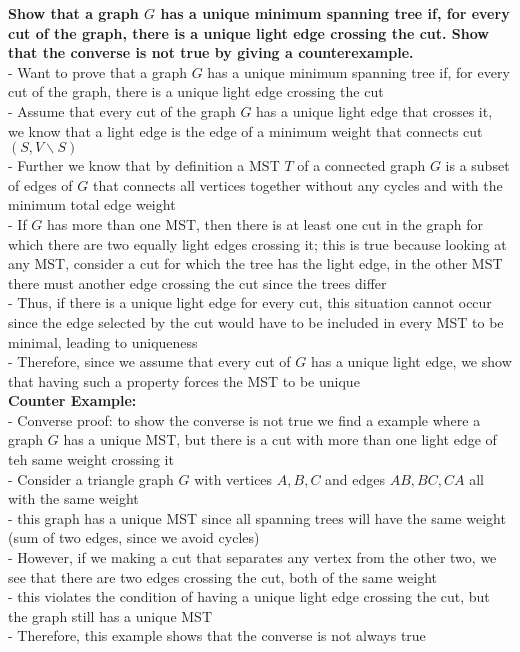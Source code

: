 \documentclass[letterpaper,12pt]{article}
\begin{document}
\begin{enumerate}
\textbf{Show that a graph $G$ has a unique minimum spanning tree if, for every cut of the
graph, there is a unique light edge crossing the cut. Show that the converse is not
true by giving a counterexample.} \\
- Want to prove that a graph $G$ has a unique minimum spanning tree if, for every cut of the graph, there is a unique light edge crossing the cut \\
- Assume that every cut of the graph $G$ has a unique light edge that crosses it, we know that a light edge is the edge of a minimum weight that connects cut $(S, V \backslash S)$ \\
- Further we know that by definition a MST $T$ of a connected graph $G$ is a subset of edges of $G$ that connects all vertices together without any cycles and with the minimum total edge weight \\
- If $G$ has more than one MST, then there is at least one cut in the graph for which there are two equally light edges crossing it; this is true because looking at any MST, consider a cut for which the tree has the light edge, in the other MST there must another edge crossing the cut since the trees differ \\
- Thus, if there is a unique light edge for every cut, this situation cannot occur since the edge selected by the cut would have to be included in every MST to be minimal, leading to uniqueness \\
- Therefore, since we assume that every cut of $G$ has a unique light edge, we show that having such a property forces the MST to be unique \\

\textbf{Counter Example:} \\
- Converse proof: to show the converse is not true we find a example where a graph $G$ has a unique MST, but there is a cut with more than one light edge of teh same weight crossing it \\
- Consider a triangle graph $G$ with vertices $A,B,C$ and edges $AB,BC,CA$ all with the same weight \\
- this graph has a unique MST since all spanning trees will have the same weight (sum of two edges, since we avoid cycles) \\
- However, if we making a cut that separates any vertex from the other two, we see that there are two edges crossing the cut, both of the same weight \\
- this violates the condition of having a unique light edge crossing the cut, but the graph still has a unique MST \\
- Therefore, this example shows that the converse is not always true


\end{enumerate}
\end{document}
